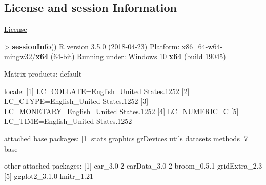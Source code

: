 \documentclass[]{article}
\newenvironment{Shaded}{\begin{snugshade}}{\end{snugshade}}
\newcommand{\KeywordTok}[1]{\textcolor[rgb]{0.13,0.29,0.53}{\textbf{{#1}}}}
\newcommand{\DecValTok}[1]{\textcolor[rgb]{0.00,0.00,0.81}{{#1}}}
\newcommand{\FloatTok}[1]{\textcolor[rgb]{0.00,0.00,0.81}{{#1}}}
\newcommand{\StringTok}[1]{\textcolor[rgb]{0.31,0.60,0.02}{{#1}}}
\newcommand{\NormalTok}[1]{{#1}}
\begin{document}
\subsection{License and session
Information}\label{license-and-session-information}

\href{http://math.wsu.edu/faculty/xchen/stat412/LICENSE.html}{License}

\begin{Shaded}
\begin{Highlighting}[]
\NormalTok{>}\StringTok{ }\KeywordTok{sessionInfo}\NormalTok{()}
\NormalTok{R version }\FloatTok{3.5.0} \NormalTok{(}\DecValTok{2018-04-23}\NormalTok{)}
\NormalTok{Platform:}\StringTok{ }\NormalTok{x86_64-w64-mingw32/}\KeywordTok{x64} \NormalTok{(}\DecValTok{64}\NormalTok{-bit)}
\NormalTok{Running under:}\StringTok{ }\NormalTok{Windows }\DecValTok{10} \KeywordTok{x64} \NormalTok{(build }\DecValTok{19045}\NormalTok{)}

\NormalTok{Matrix products:}\StringTok{ }\NormalTok{default}

\NormalTok{locale:}
\NormalTok{[}\DecValTok{1}\NormalTok{] LC_COLLATE=English_United States}\FloatTok{.1252} 
\NormalTok{[}\DecValTok{2}\NormalTok{] LC_CTYPE=English_United States}\FloatTok{.1252}   
\NormalTok{[}\DecValTok{3}\NormalTok{] LC_MONETARY=English_United States}\FloatTok{.1252}
\NormalTok{[}\DecValTok{4}\NormalTok{] LC_NUMERIC=C                          }
\NormalTok{[}\DecValTok{5}\NormalTok{] LC_TIME=English_United States}\FloatTok{.1252}    

\NormalTok{attached base packages:}
\NormalTok{[}\DecValTok{1}\NormalTok{] stats     graphics  grDevices utils     datasets  methods  }
\NormalTok{[}\DecValTok{7}\NormalTok{] base     }

\NormalTok{other attached packages:}
\NormalTok{[}\DecValTok{1}\NormalTok{] car_3}\FloatTok{.0}\DecValTok{-2}     \NormalTok{carData_3}\FloatTok{.0}\DecValTok{-2} \NormalTok{broom_0}\FloatTok{.5.1}   \NormalTok{gridExtra_2}\FloatTok{.3}
\NormalTok{[}\DecValTok{5}\NormalTok{] ggplot2_3}\FloatTok{.1.0} \NormalTok{knitr_1}\FloatTok{.21}   


\end{Highlighting}
\end{Shaded}
\end{document}
